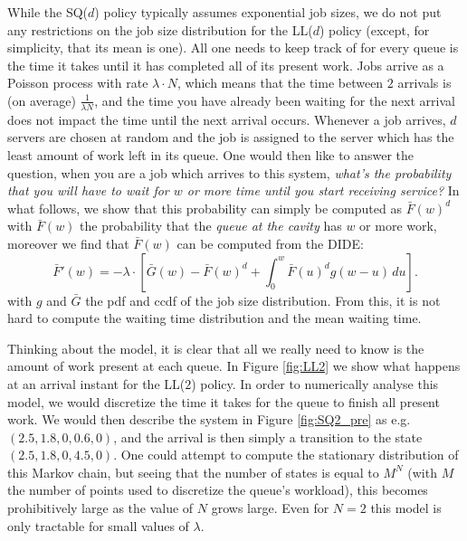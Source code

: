 \documentclass[12pt]{report}
\begin{document}
While the SQ($d$) policy typically assumes exponential job sizes, we do not put any restrictions on the job size distribution for the LL($d$) policy (except, for simplicity, that its mean is one). All one needs to keep track of for every queue is the time it takes until it has completed all of its present work. Jobs arrive as a Poisson process with rate $\lambda \cdot N$, which means that the time between $2$ arrivals is (on average) $\frac{1}{\lambda N}$, and the time you have already been waiting for the next arrival does not impact the time until the next arrival occurs. Whenever a job arrives, $d$ servers are chosen at random and the job is assigned to the server which has the least amount of work left in its queue. One would then like to answer the question, when you are a job which arrives to this system, \textit{what's the probability that you will have to wait for $w$ or more time until you start receiving service?} In what follows, we show that this probability can simply be computed as $\bar F(w)^d$ with $\bar F(w)$ the probability that the \textit{queue at the cavity} has $w$ or more work, moreover we find that $\bar F(w)$ can be computed from the DIDE:
$$
\bar F'(w) = - \lambda \cdot \left[ \bar G(w) - \bar F(w)^d + \int_0^w \bar F(u)^d g(w-u) \, du \right].
$$
with $g$ and $\bar G$ the pdf and ccdf of the job size distribution. From this, it is not hard to compute the waiting time distribution and the mean waiting time.

Thinking about the model, it is clear that all we really need to know is the amount of work present at each queue. In Figure \ref{fig:LL2} we show what happens at an arrival instant for the LL($2$) policy. In order to numerically analyse this model, we would discretize the time it takes for the queue to finish all present work. We would then describe the system in Figure \ref{fig:SQ2_pre} as e.g.~$(2.5,1.8,0,0.6,0)$, and the arrival is then simply a transition to the state $(2.5,1.8,0,4.5,0)$. One could attempt to compute the stationary distribution of this Markov chain, but seeing that the number of states is equal to $M^N$ (with $M$ the number of points used to discretize the queue's workload), this becomes prohibitively large as the value of $N$ grows large. Even for $N=2$ this model is only tractable for small values of $\lambda$.
\end{document}
